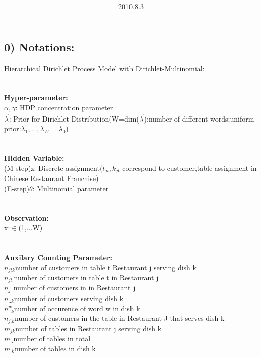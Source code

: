 \documentclass{article}
\title{\vspace{0.3in}\textmd{\textbf{\hmwkTitle}}}
\date{2010.8.3}
\author{\textbf{\hmwkAuthorName}}
\begin{document}
\begin{spacing}{1.1}
\maketitle
\section{0) Notations:}
Hierarchical Dirichlet Process Model with Dirichlet-Multinomial:\\ \\ \\
{\bf Hyper-parameter:}\\
$\alpha,\gamma$: HDP concentration parameter\\
$\vec \lambda$: Prior for Dirichlet Distribution(W=dim($\vec \lambda$):number of different words;uniform prior:$\lambda_{1},...,\lambda_{W}=\lambda_{0}$)\\ \\ \\
{\bf Hidden Variable:}\\
(M-step)z: Discrete assignment($t_{ji},k_{jt}$ correspond to customer,table assignment in Chinese Restaurant Franchise)\\
(E-step)$\theta$: Multinomial parameter\\ \\ \\
{\bf Observation:}\\
x:$\in$(1,...W)\\ \\ \\
{\bf Auxilary Counting Parameter:}\\
$n_{jtk}$number of customers in table t Restaurant j serving dish k \\
$n_{jt.}$number of customers in table t in Restaurant j \\
$n_{j..}$number of customers in in Restaurant j \\
$n_{..k}$number of customers serving dish k \\
$n_{..k}^{w}$number of occurence of word w in dish k \\
$n_{j.k}$number of customers in the table in Restaurant J that serves dish k \\
$m_{jk}$number of tables in Restaurant j serving dish k\\
$m_{..}$number of tables in total \\
$m_{.k}$number of tables in dish k \\
\newpage

\end{spacing}
\end{document}
